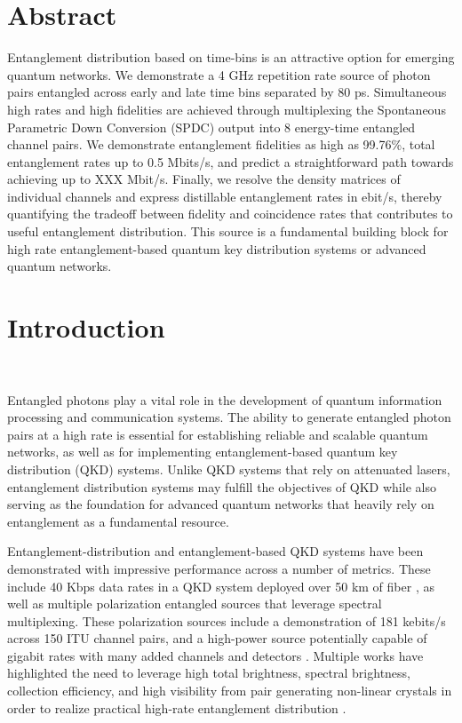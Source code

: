 \documentclass[11pt]{caltech_thesis} %
\begin{document}
\hypertarget{abstract-3}{%
\section{Abstract}\label{abstract-3}}

Entanglement distribution based on time-bins is an attractive option for
emerging quantum networks. We demonstrate a 4 GHz repetition rate source
of photon pairs entangled across early and late time bins separated by
80 ps. Simultaneous high rates and high fidelities are achieved through
multiplexing the Spontaneous Parametric Down Conversion (SPDC) output
into 8 energy-time entangled channel pairs. We demonstrate entanglement
fidelities as high as 99.76\%, total entanglement rates up to 0.5
Mbits/s, and predict a straightforward path towards achieving up to
{\color{darkred} XXX} Mbit/s. Finally, we resolve the density matrices
of individual channels and express distillable entanglement rates in
ebit/s, thereby quantifying the tradeoff between fidelity and
coincidence rates that contributes to useful entanglement distribution.
This source is a fundamental building block for high rate
entanglement-based quantum key distribution systems or advanced quantum
networks.

\hypertarget{introduction-4}{%
\section{Introduction}\label{introduction-4}}

~~~~~

Entangled photons play a vital role in the development of quantum
information processing and communication systems. The ability to
generate entangled photon pairs at a high rate is essential for
establishing reliable and scalable quantum networks, as well as for
implementing entanglement-based quantum key distribution (QKD) systems.
Unlike QKD systems that rely on attenuated lasers, entanglement
distribution systems may fulfill the objectives of QKD while also
serving as the foundation for advanced quantum networks that heavily
rely on entanglement as a fundamental resource.

Entanglement-distribution and entanglement-based QKD systems have been
demonstrated with impressive performance across a number of metrics.
These include 40 Kbps data rates in a QKD system deployed over 50 km of
fiber \autocite{Pelet2022}, as well as multiple polarization entangled
sources that leverage spectral multiplexing. These polarization sources
include a demonstration of 181 kebits/s across 150 ITU channel pairs,
and a high-power source potentially capable of gigabit rates with many
added channels and detectors
\autocite{Alshowkan2022,Neumann2022Entanglement}. Multiple works have
highlighted the need to leverage high total brightness, spectral
brightness, collection efficiency, and high visibility from pair
generating non-linear crystals in order to realize practical high-rate
entanglement distribution \autocite{Neumann2022Entanglement}.
\end{document}
